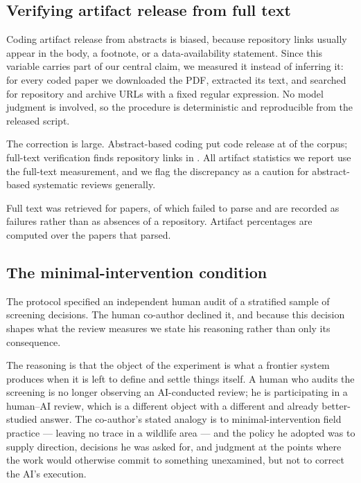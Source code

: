 \subsection{Verifying artifact release from full text}
\label{sec:artifacts}

Coding artifact release from abstracts is biased, because repository links usually appear in
the body, a footnote, or a data-availability statement. Since this variable carries part of
our central claim, we measured it instead of inferring it: for every coded paper we downloaded
the PDF, extracted its text, and searched for repository and archive URLs with a fixed regular
expression. No model judgment is involved, so the procedure is deterministic and reproducible
from the released script.

The correction is large. Abstract-based coding put code release at \pctRepoAbstract{} of the
corpus; full-text verification finds repository links in \pctRepo{}. All artifact statistics
we report use the full-text measurement, and we flag the discrepancy as a caution for
abstract-based systematic reviews generally.

Full text was retrieved for \nArtAttempted{} papers, of which \nArtFailed{} failed to parse
and are recorded as failures rather than as absences of a repository. Artifact percentages are
computed over the \nArtChecked{} papers that parsed.

\subsection{The minimal-intervention condition}
\label{sec:minimal}

The protocol specified an independent human audit of a stratified sample of screening
decisions. The human co-author declined it, and because this decision shapes what the review
measures we state his reasoning rather than only its consequence.

The reasoning is that the object of the experiment is what a frontier system produces when it
is left to define and settle things itself. A human who audits the screening is no longer
observing an AI-conducted review; he is participating in a human--AI review, which is a
different object with a different and already better-studied answer. The co-author's stated
analogy is to minimal-intervention field practice --- leaving no trace in a wildlife area ---
and the policy he adopted was to supply direction, decisions he was asked for, and judgment at
the points where the work would otherwise commit to something unexamined, but not to correct
the AI's execution.

